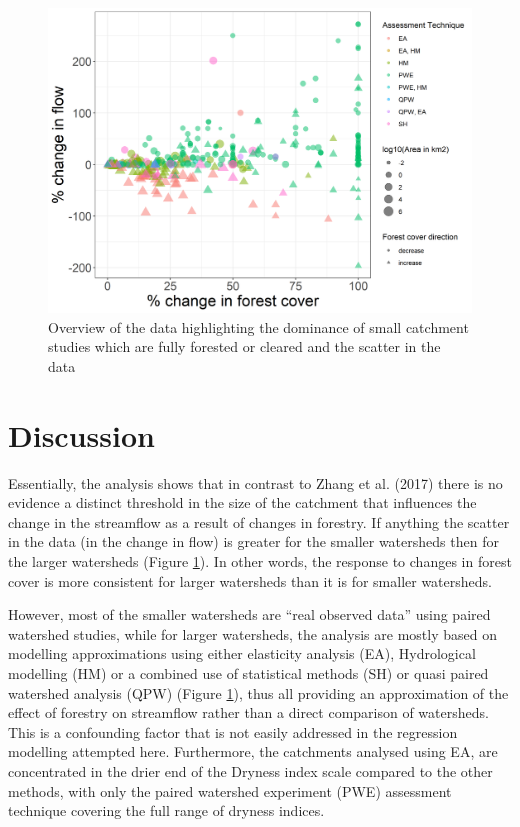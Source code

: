 \documentclass[]{elsarticle} %
\begin{document}
\begin{figure}
\includegraphics[width=0.9\linewidth]{flow_forest_byArea} \caption{Overview of the data highlighting the dominance of small catchment studies which are fully forested or cleared and the scatter in the data}\label{fig:overview}
\end{figure}

\hypertarget{discussion}{%
\section{Discussion}\label{discussion}}

Essentially, the analysis shows that in contrast to Zhang et al. (2017) there is no evidence a distinct threshold in the size of the catchment that influences the change in the streamflow as a result of changes in forestry. If anything the scatter in the data (in the change in flow) is greater for the smaller watersheds then for the larger watersheds (Figure \ref{fig:overview}). In other words, the response to changes in forest cover is more consistent for larger watersheds than it is for smaller watersheds.

However, most of the smaller watersheds are ``real observed data'' using paired watershed studies, while for larger watersheds, the analysis are mostly based on modelling approximations using either elasticity analysis (EA), Hydrological modelling (HM) or a combined use of statistical methods (SH) or quasi paired watershed analysis (QPW) (Figure \ref{fig:overview}), thus all providing an approximation of the effect of forestry on streamflow rather than a direct comparison of watersheds. This is a confounding factor that is not easily addressed in the regression modelling attempted here. Furthermore, the catchments analysed using EA, are concentrated in the drier end of the Dryness index scale compared to the other methods, with only the paired watershed experiment (PWE) assessment technique covering the full range of dryness indices.
\end{document}
